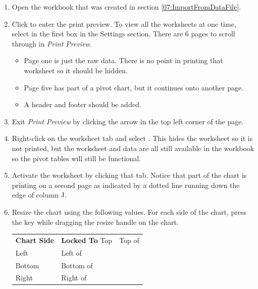 \begin{enumbox}
	\begin{enumerate}
		\item Open the  workbook that was created in section \ref{07:ImportFromDataFile}.
		\item Click  to enter the print preview. To view all the worksheets at one time, select  in the first box in the Settings section. There are $ 6 $ pages to scroll through in \textit{Print Preview}. 
	
		\begin{itemize}
			\item Page one is just the raw data. There is no point in printing that worksheet so it should be hidden.
			\item Page five has part of a pivot chart, but it continues onto another page.
			\item A header and footer should be added.
		\end{itemize}
	
		\item Exit \textit{Print Preview} by clicking the arrow in the top left corner of the page.
		\item Right-click on the  worksheet tab and select . This hides the worksheet so it is not printed, but the worksheet and data are all still available in the workbook so the pivot tables will still be functional.
		\item Activate the  worksheet by clicking that tab. Notice that part of the chart is printing on a second page as indicated by a dotted line running down the edge of column J. 
		\item Resize the chart using the following values. For each side of the chart, press the  key while dragging the resize handle on the chart.
	
		\begin{table}[H]
		\captionsetup{labelformat=empty} %
		{\small
			\begin{longtable}{R{0.75in}L{1.50in}} %
				\textbf{Chart Side} & \textbf{Locked To} \endhead
				\hline
				Top & Top of \\
				Left & Left of \\
				Bottom & Bottom of \\
				Right & Right of \\
			\end{longtable}
		} %
		\end{table}


\end{enumerate}
\end{enumbox}
